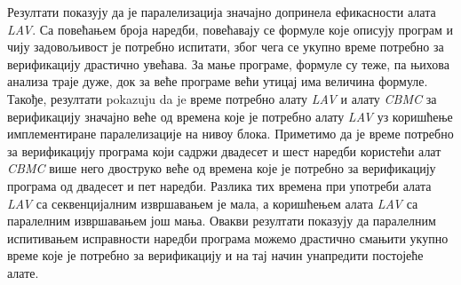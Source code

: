 \documentclass[12pt,oneside]{memoir}
\begin{document}
  Резултати показују да је паралелизација значајно допринела ефикасности алата \textit{LAV}. Са повећањем броја наредби, повећавају се формуле које описују програм и чију задовољивост је потребно испитати, због чега се укупно време потребно за верификацију драстично увећава. За мање програме, формуле су теже, па њихова анализа траје дуже, док за веће програме већи утицај има величина формуле. Такође, резултати pokazuju da je време потребно алату \textit{LAV} и алату \textit{CBMC} за верификацију значајно веће од времена које је потребно алату \textit{LAV} уз коришћење имплементиране паралелизације на нивоу блока. Приметимо да је време потребно за верификацију програма који садржи двадесет и шест наредби користећи алат \textit{CBMC} више него двоструко веће од времена које је потребно за верификацију програма од двадесет и пет наредби. Разлика тих времена при употреби алата \textit{LAV} са секвенцијалним извршавањем је мала, а коришћењем алата \textit{LAV} са паралелним извршавањем још мања. Овакви резултати показују да паралелним испитивањем исправности наредби програма можемо драстично смањити укупно време које је потребно за верификацију и на тај начин унапредити постојеће алате.
  
\end{document}
